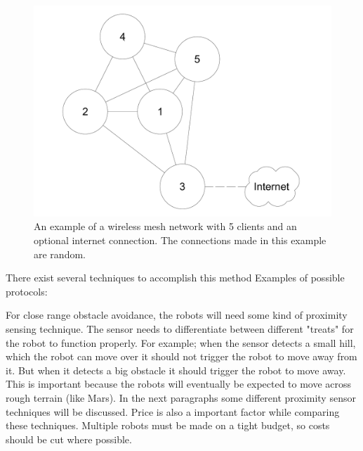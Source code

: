 \documentclass[10pt,a4paper]{article}
\begin{document}
\begin{figure}[H]
   \centering
   \includegraphics[width=1\textwidth]{WMN}
   \caption{An example of a wireless mesh network with 5 clients and an optional internet connection. The connections made in this example are random.}
   \label{fig:WMN}
\end{figure}




There exist several techniques to accomplish this method 
Examples of possible protocols:


\newpage




For close range obstacle avoidance, the robots will need some kind of proximity sensing technique. The sensor needs to differentiate between different "treats" for the robot to function properly. For example; when the sensor detects a small hill, which the robot can move over it should not trigger the robot to move away from it. But when it detects a big obstacle it should trigger the robot to move away. This is important because the robots will eventually be expected to move across rough terrain (like Mars). In the next paragraphs some different proximity sensor techniques will be discussed. Price is also a important factor while comparing these techniques. Multiple robots must be made on a tight budget, so costs should be cut where possible.\\
\end{document}
